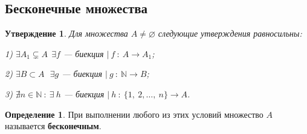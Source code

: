 \documentclass[12pt,oneside]{article}
\newtheorem{statement}{Утверждение}[section]
\theoremstyle{definition}
\newtheorem{definition}{Определение}
\begin{document}
\subsection{Бесконечные множества}

\begin{statement}\label{infinity}
Для множества $A\neq \varnothing$ следующие утверждения равносильны:

1) $\exists A_1 \varsubsetneq A\ \ \exists f$ --- биекция $|\ f\ :\ A \longrightarrow A_1$;

2) $\exists B\subset A\ \ \ \exists g$ --- биекция $|\ g\ :\ \mathbb{N} \longrightarrow B$;

3) $\nexists n\in \mathbb{N}\ :\ \exists\ h$ --- биекция $|\ h\ :\ \{1,\ 2,\dots ,\ n\} \longrightarrow A$.
\end{statement}
\begin{definition}
При выполнении любого из этих условий множество $A$ называется \textbf{бесконечным}.
\end{definition}
\end{document}
